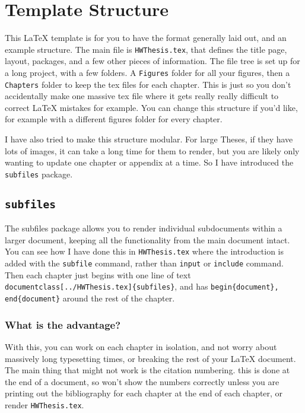 \documentclass[../HWThesis.tex]{subfiles} %
\begin{document}
\section{Template Structure}
This LaTeX template is for you to have the format generally laid out, and an example structure. The main file is \texttt{HWThesis.tex}, that defines the title page, layout, packages, and a few other pieces of information. The file tree is set up for a long project, with a few folders. A \texttt{Figures} folder for all your figures, then a \texttt{Chapters} folder to keep the tex files for each chapter. This is just so you don't accidentally make one massive tex file where it gets really really difficult to correct LaTeX mistakes for example. You can change this structure if you'd like,  for example with a different figures folder for every chapter. 

I have also tried to make this structure modular. For large Theses, if they have lots of images, it can take a long time for them to render, but you are likely only wanting to update one chapter or appendix at a time. So I have introduced the \texttt{subfiles} package. 

\subsection{\texttt{subfiles}}
The subfiles package allows you to render individual subdocuments within a larger document, keeping all the functionality from the main document intact. You can see how I have done this in \texttt{HWThesis.tex} where the introduction is added with the \texttt{subfile} command, rather than \texttt{input} or \texttt{include} command. Then each chapter just begins with one line of text\texttt{ \\documentclass[../HWThesis.tex]\{subfiles\}}, and has \texttt{begin\{document\}, end\{document\}} around the rest of the chapter. 

\subsubsection{What is the advantage?}
With this, you can work on each chapter in isolation, and not worry about massively long typesetting times, or breaking the rest of your LaTeX document. The main thing that might not work is the citation numbering. this is done at the end of a document, so won't show the numbers correctly unless you are printing out the bibliography for each chapter at the end of each chapter, or render \texttt{HWThesis.tex}. 
\end{document}
